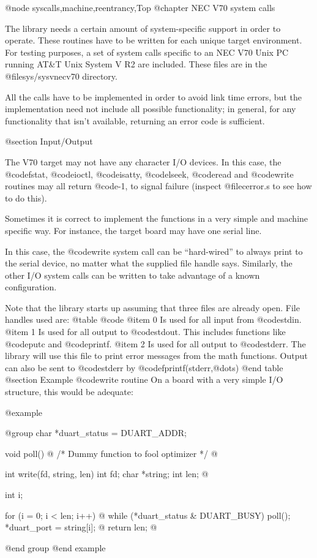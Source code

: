 @node syscalls,machine,reentrancy,Top
@chapter NEC V70 system calls

The library needs a certain amount of system-specific support in order
to operate.  These routines have to be written for each unique
target environment.  For testing purposes,
a set of system calls specific to an NEC V70 Unix PC running AT&T Unix
System V R2 are included.  These files are in the @file{sys/sysvnecv70}
directory.

All the calls have to be implemented in order to avoid link time
errors, but the implementation need not include all possible
functionality; in general, for any functionality that isn't
available, returning an error code is sufficient.

@section Input/Output

The V70 target may not have any character I/O devices.
In this case, the @code{fstat}, @code{ioctl}, @code{isatty},
@code{lseek}, @code{read} and @code{write} routines may all return @code{-1},
to signal failure (inspect @file{cerror.s} to see how to do this).

Sometimes it is correct to implement the functions in a very
simple and machine specific way.  For instance, the target board may
have one serial line.

In this case, the @code{write} system call can be ``hard-wired'' to
always print to the serial device, no matter what the supplied file
handle says. Similarly, the other I/O system calls can be written to
take advantage of a known configuration.

Note that the library starts up assuming that three files are already
open.  File handles used are:
@table @code
@item 0
Is used for all input from @code{stdin}.
@item 1
Is used for all output to @code{stdout}.  This includes functions like
@code{putc} and @code{printf}.
@item 2
Is used for all output to @code{stderr}.  The library will use this
file to print error messages from the math functions.  Output can
also be sent to @code{stderr} by @code{fprintf(stderr,@dots{})}
@end table
@section Example @code{write} routine
On a board with a very simple I/O structure, this would be adequate:

@example

@group
char *duart_status = DUART_ADDR;

void poll()
@{
   /* Dummy function to fool optimizer */
@}

int write(fd, string, len)
int fd;
char *string;
int len;
@{
  int i;

  for (i = 0; i < len; i++)
  @{
    while (*duart_status & DUART_BUSY)
     poll();
    *duart_port = string[i];
  @}
  return len;
@}
@end group
@end example

